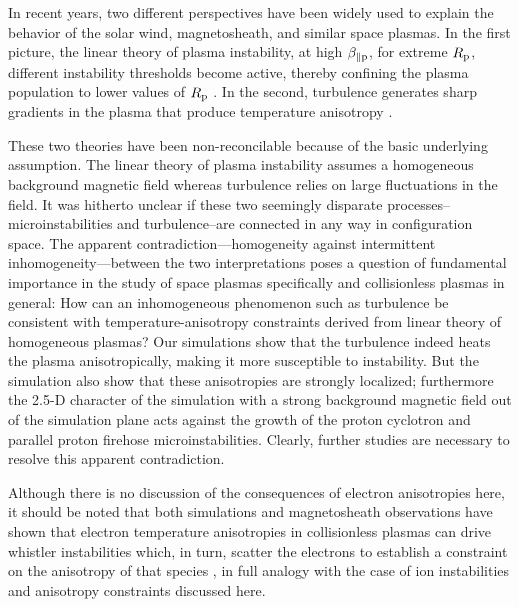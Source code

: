         In recent years, two different perspectives have been widely used to explain the behavior of
        the solar wind, magnetosheath, and similar space plasmas. In the first picture, the linear
        theory of plasma instability, at high $\beta_{\parallel \rm p}$, for extreme $R_{\rm p}$,
        different instability thresholds become active, thereby confining the plasma population to
        lower values of $R_{\rm p}$
        \citep{Gary2001,Kasper2002,Hellinger2006,Matteini2007,Klein2018}. In the second, turbulence
        generates sharp gradients in the plasma that produce temperature anisotropy
        \citep{Osman2011,Greco2012,Valentini2014,Parashar2016}.

        These two theories have been non-reconcilable because of the basic underlying assumption.
        The linear theory of plasma instability assumes a homogeneous background magnetic field
        whereas turbulence relies on large fluctuations in the field. It was hitherto unclear if
        these two seemingly disparate processes--microinstabilities and turbulence--are connected in
        any way in configuration space. The apparent contradiction---homogeneity against
        intermittent inhomogeneity---between the two interpretations poses a question of fundamental
        importance in the study of space plasmas specifically and collisionless plasmas in general:
        How can an inhomogeneous phenomenon such as turbulence be consistent with
        temperature-anisotropy constraints derived from linear theory of homogeneous plasmas? Our
        simulations show that the turbulence indeed heats the plasma anisotropically, making it more
        susceptible to instability. But the simulation also show that these anisotropies are
        strongly localized; furthermore the 2.5-D character of the simulation with a strong
        background magnetic field out of the simulation plane acts against the growth of the proton
        cyclotron and parallel proton firehose microinstabilities. Clearly, further studies are
        necessary to resolve this apparent contradiction.

        Although there is no discussion of the consequences of electron anisotropies here, it should
        be noted that both simulations and magnetosheath observations \citep{Gary2005} have shown
        that electron temperature anisotropies in collisionless plasmas can drive whistler
        instabilities which, in turn, scatter the electrons to establish a constraint on the
        anisotropy of that species \citep{Gary1996}, in full analogy with the case of ion
        instabilities and anisotropy constraints discussed here.

